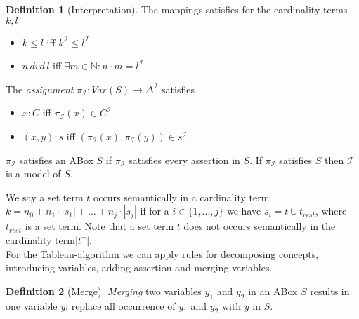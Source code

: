 \documentclass[a4paper,11pt]{scrartcl}
\theoremstyle{break}
\theoremstyle{definition}
\newtheorem{mydef}{Definition}
\begin{document}
\begin{mydef}[Interpretation]
The mappings satisfies for the cardinality terms $k,l$
\begin{itemize}
\item $k\leq l$ iff $k^\mathcal{I}\leq l^\mathcal{I}$
\item $n\,dvd\,l$ iff $\exists m\in\mathbb{N}:n\cdot m = l^\mathcal{I}$
\end{itemize}
The \textit{assignment} $\pi_\mathcal{I}:Var(S)\rightarrow\Delta^\mathcal{I}$ satisfies
\begin{itemize}
\item $x:C$ iff $\pi_\mathcal{I}(x)\in C^\mathcal{I}$ 
\item $(x,y):s$ iff $(\pi_\mathcal{I}(x),\pi_\mathcal{I}(y))\in s^\mathcal{I}$
\end{itemize} 
$\pi_\mathcal{I}$ satisfies an ABox $S$ if $\pi_\mathcal{I}$ satisfies every assertion in $S$. If $\pi_\mathcal{I}$ satisfies $S$ then $\mathcal{I}$ is a model of $S$.
\end{mydef}
We say a set term $t$ occurs semantically in a cardinality term $k=n_0+n_1\cdot |s_1|+\dots +n_j\cdot|s_j|$ if for a $i\in\{1,\dots ,j\}$ we have $s_i=t\cup t_{rest}$, where $t_{rest}$ is a set term. Note that a set term $t$ does not occurs semantically in the cardinality term$|t^\neg|$.\\
For the Tableau-algorithm we can apply rules for decomposing concepts, introducing variables, adding assertion and merging variables.
\begin{mydef}[Merge]
\textit{Merging} two variables $y_1$ and $y_2$ in an ABox $S$ results in one variable $y$: replace all occurrence of $y_1$ and $y_2$ with $y$ in $S$. 
\end{mydef}
\end{document}
